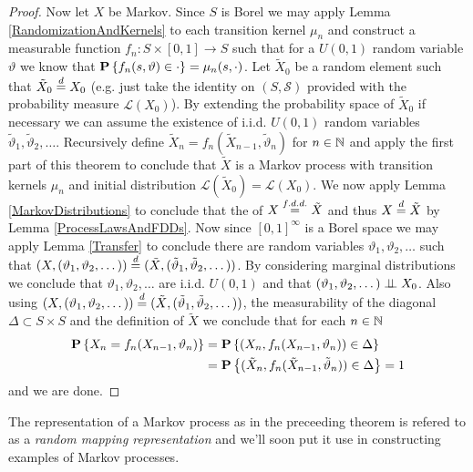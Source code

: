 \begin{proof}
Now let $X$ be Markov.  Since $S$ is Borel we may apply Lemma \ref{RandomizationAndKernels}
to each transition kernel $\mu_n$ and construct a measurable function
$f_n : S \times [0,1] \to S$ such that for a $U(0,1)$ random variable
$\vartheta$ we know that $\textbf{P}\left \{f_n(s, \vartheta) \in \cdot \right \} = \mu_n(s,
\cdot)$.  Let $\tilde{X}_0$ be a random element such that $\tilde{X}_0
\overset{d}= X_0$ (e.g. just take the identity on $(S, \mathcal{S})$
provided with the probability measure $\mathcal{L}(X_0)$).  By
extending the probability space of $\tilde{X}_0$ if necessary we
can assume the existence of i.i.d. $U(0,1)$ random variables
$\tilde{\vartheta}_1, \tilde{\vartheta}_2, \dotsc$.  Recursively
define $\tilde{X}_n = f_n(\tilde{X}_{n-1}, \tilde{\vartheta}_n)$ for
$n \in \mathbb{N}$ and apply the first part of this theorem to conclude
that $\tilde{X}$ is a Markov process with transition kernels $\mu_n$
and initial distribution $\mathcal{L}(\tilde{X}_0) =
\mathcal{L}(X_0)$.  We now apply Lemma \ref{MarkovDistributions} to
conclude that the of $X \overset{f.d.d.}= \tilde{X}$ and thus $X
\overset{d}= \tilde{X}$ by Lemma \ref{ProcessLawsAndFDDs}.  Now since
$[0,1]^\infty$ is a Borel space we may
apply Lemma \ref{Transfer} to conclude there are
random variables $\vartheta_1, \vartheta_2, \dotsc$ such that $(X,
(\vartheta_1, \vartheta_2, \dotsc)) \overset{d}= (\tilde{X},
(\tilde{\vartheta}_1, \tilde{\vartheta}_2, \dotsc))$.  By considering
marginal distributions we conclude that 
$\vartheta_1, \vartheta_2, \dotsc$ are i.i.d. $U(0,1)$ and that
$(\vartheta_1, \vartheta_2, \dotsc) \perp \! \! \! \perp X_0$. Also using $(X,
(\vartheta_1, \vartheta_2, \dotsc)) \overset{d}= (\tilde{X},
(\tilde{\vartheta}_1, \tilde{\vartheta}_2, \dotsc))$, the
measurability of the diagonal $\Delta \subset S \times S$ and the
definition of $\tilde{X}$ we conclude
that for each $n \in \mathbb{N}$ 
\begin{align*}
\textbf{P}\left \{X_n = f_n(X_{n-1}, \vartheta_n) \right \} &= \textbf{P}\left \{(X_n,
  f_n(X_{n-1}, \vartheta_n)) \in \Delta \right \} \\
&= \textbf{P}\left \{(\tilde{X}_n,
  f_n(\tilde{X}_{n-1}, \tilde{\vartheta}_n)) \in \Delta \right \} = 1
\end{align*}
and we are done.
\end{proof}

The representation of a Markov process as in the preceeding theorem is
refered to as a \emph{random mapping representation} and we'll soon
put it use in constructing examples of Markov processes.


